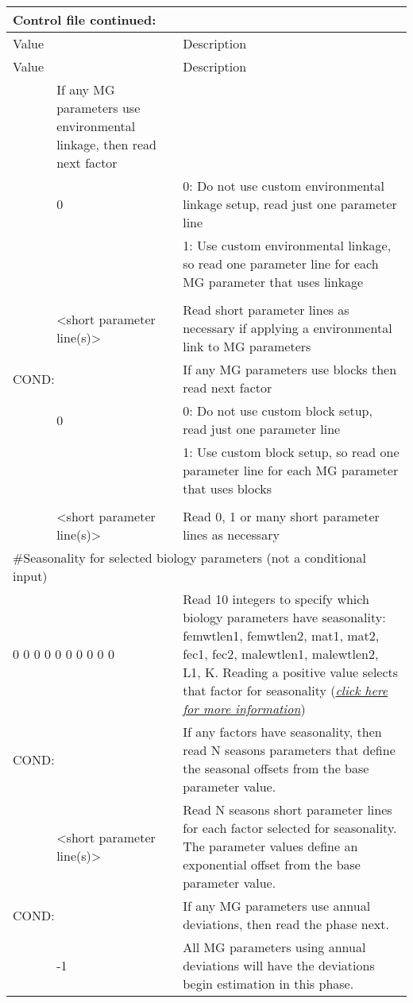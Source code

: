 \begin{center}
	\begin{longtable}{p{0.5cm} p{2.5cm} p{11cm}}
		\multicolumn{3}{l}{Control file continued:}\\
		\hline
		Value & &  Description\\
		\hline
		\endfirsthead

		\hline
		Value & &  Description\\
		\hline
		\endhead

		\endfoot
		\endlastfoot

		\multicolumn{2}{l}{COND:} & If any MG parameters use environmental linkage, then read next factor\\
		& 0 & 0:  Do not use custom environmental linkage setup, read just one parameter line \\
		&   & 1:  Use custom environmental linkage, so read one parameter line for each MG parameter that uses linkage\\
		\\
		& <short parameter line(s)> & Read short parameter lines as necessary if applying a environmental link to MG parameters\\
		\hline
		\multicolumn{2}{l}{COND:} & If any MG parameters use blocks then read next factor \\
		& 0 & 0:  Do not use custom block setup, read just one parameter line \\
		&   & 1:  Use custom block setup, so read one parameter line for each MG parameter that uses blocks\\
		\\
		& <short parameter line(s)> & Read 0, 1 or many short parameter lines as necessary\\
		\hline
		\multicolumn{3}{l}{\#Seasonality for selected biology parameters (not a conditional input)}\\
		\multicolumn{2}{l}{0 0 0 0 0 0 0 0 0 0} & Read 10 integers to specify which biology parameters have seasonality:  femwtlen1, femwtlen2, mat1, mat2, fec1, fec2, malewtlen1, malewtlen2, L1, K.  Reading a positive value selects that factor for seasonality (\hyperlink{SeasGrowth}{\textit{click here for more information}})\\
		\hline
		\multicolumn{2}{l}{COND:} & If any factors have seasonality, then read N seasons parameters that define the seasonal offsets from the base parameter value.\\
		& <short parameter line(s)> & Read N seasons short parameter lines for each factor selected for seasonality.
		The parameter values define an exponential offset from the base parameter value.\\
		\hline
		\multicolumn{2}{l}{COND:} & If any MG parameters use annual deviations, then read the phase next. \\
		& -1 & All MG parameters using annual deviations will have the deviations begin estimation in this phase.\\
		\hline
	\end{longtable}
\end{center}

